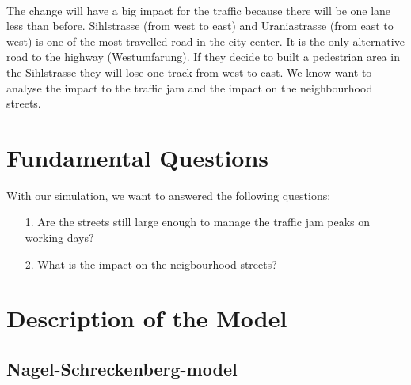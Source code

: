 \documentclass[11pt]{article}
\begin{document}
\\
The change will have a big impact for the traffic because there will be one lane less than before. Sihlstrasse (from west to east) and Uraniastrasse (from east to west) is one of the most travelled  road in the city center. It is the only alternative road to the highway (Westumfarung). If they decide to built a pedestrian area in the Sihlstrasse they will lose one track from west to east\cite{project}.
We know want to analyse the impact to the traffic jam and the impact on the neighbourhood streets.

\section{Fundamental Questions}

With our simulation, we want to answered the following questions:
\begin{itemize}
\item[1.] Are the streets still large enough to manage the traffic jam peaks on working days?
\item[2.] What is the impact on the neigbourhood streets?

\end{itemize}
\section{Description of the Model}

\subsection{Nagel-Schreckenberg-model}
\end{document}

